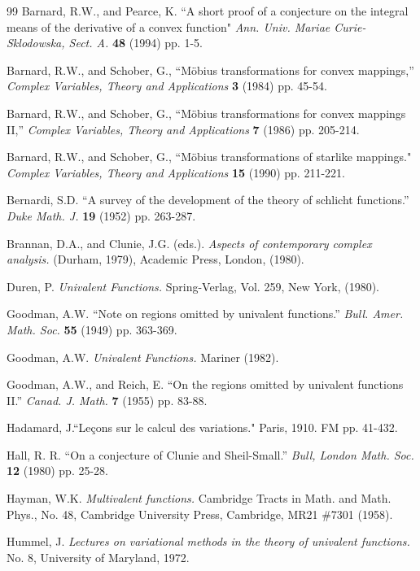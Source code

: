 \documentclass[final]{siamltex}
\begin{document}
\begin{thebibliography}{99}
 Barnard, R.W., and Pearce, K.  ``A short proof of a conjecture
on the integral means of the derivative of a convex function" {\em Ann. Univ. Mariae
Curie-Sklodowska, Sect. A.} {\bf 48} (1994) pp. 1-5.

 Barnard, R.W., and Schober, G., ``M\"{o}bius
transformations for convex mappings,'' {\em Complex Variables, Theory
and Applications} {\bf 3} (1984) pp. 45-54.

 Barnard, R.W., and Schober, G., ``M\"{o}bius
transformations for convex mappings II,'' {\em Complex Variables,
Theory and Applications} {\bf 7} (1986) pp. 205-214.

 Barnard, R.W., and Schober, G., ``M\"{o}bius
transformations of starlike mappings." {\em Complex Variables,
Theory and Applications} {\bf 15} (1990) pp. 211-221.


 Bernardi, S.D.  ``A survey of the development of the
theory of schlicht functions.''  {\em Duke Math. J.}  {\bf 19} (1952) pp.
263-287.

 Brannan, D.A., and Clunie, J.G. (eds.).  {\em Aspects
of contemporary complex analysis.}  (Durham, 1979), Academic
Press, London, (1980).

 Duren, P.  {\em Univalent Functions.}
Spring-Verlag, Vol. 259, New York, (1980).

 Goodman, A.W.  ``Note on regions omitted by
univalent functions.''  {\em Bull. Amer. Math. Soc.}  {\bf 55} (1949) pp.
363-369.

 Goodman, A.W.  {\em Univalent Functions.}  Mariner
(1982).

 Goodman, A.W., and Reich, E.  ``On the regions
omitted by univalent functions II.''  {\em Canad. J. Math.}  {\bf 7}
(1955) pp. 83-88.

 Hadamard, J.``Le\c cons sur le calcul des variations."
Paris, 1910. FM pp. 41-432.

 Hall, R. R. ``On a conjecture of Clunie and
Sheil-Small.''  {\em Bull, London Math. Soc.} {\bf 12} (1980) pp.
25-28.

 Hayman, W.K.  {\em Multivalent functions.}  
Cambridge Tracts in Math. and Math. Phys.,  No. 48, Cambridge
University Press, Cambridge, MR21 \#7301 (1958).

 Hummel, J. {\em Lectures on variational methods in the
theory of univalent functions.}  No. 8, University of Maryland, 1972.


\end{thebibliography}
\end{document}
